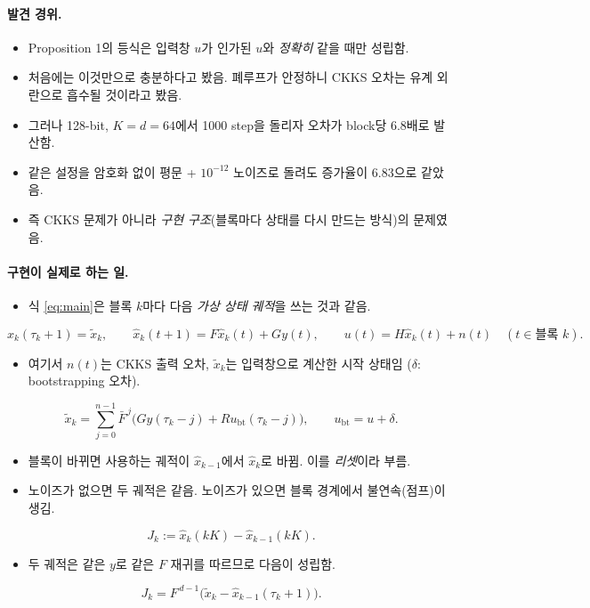 \documentclass[11pt,a4paper]{article}
\newcommand{\Fb}{\bar F}
\begin{document}
\paragraph{발견 경위.}
\begin{itemize}
\item Proposition 1의 등식은 입력창 $u$가 인가된 $u$와 \emph{정확히} 같을 때만 성립함.
\item 처음에는 이것만으로 충분하다고 봤음. 폐루프가 안정하니 CKKS 오차는 유계 외란으로 흡수될 것이라고 봤음.
\item 그러나 128-bit, $K=d=64$에서 1000 step을 돌리자 오차가 block당 6.8배로 발산함.
\item 같은 설정을 암호화 없이 평문 + $10^{-12}$ 노이즈로 돌려도 증가율이 6.83으로 같았음.
\item 즉 CKKS 문제가 아니라 \emph{구현 구조}(블록마다 상태를 다시 만드는 방식)의 문제였음.
\end{itemize}

\paragraph{구현이 실제로 하는 일.}
\begin{itemize}
\item 식 \eqref{eq:main}은 블록 $k$마다 다음 \emph{가상 상태 궤적}을 쓰는 것과 같음.
\end{itemize}
\begin{equation}
\hat x_k(\tau_k+1)=\tilde x_k,\qquad \hat x_k(t+1)=F\hat x_k(t)+Gy(t),\qquad u(t)=H\hat x_k(t)+n(t)\quad(t\in\text{블록 }k).
\end{equation}
\begin{itemize}
\item 여기서 $n(t)$는 CKKS 출력 오차, $\tilde x_k$는 입력창으로 계산한 시작 상태임 ($\delta$: bootstrapping 오차).
\end{itemize}
\begin{equation}
\tilde x_k=\sum_{j=0}^{n-1}\Fb^{\,j}\bigl(Gy(\tau_k-j)+Ru_{\mathrm{bt}}(\tau_k-j)\bigr),\qquad u_{\mathrm{bt}}=u+\delta .
\end{equation}
\begin{itemize}
\item 블록이 바뀌면 사용하는 궤적이 $\hat x_{k-1}$에서 $\hat x_k$로 바뀜. 이를 \emph{리셋}이라 부름.
\item 노이즈가 없으면 두 궤적은 같음. 노이즈가 있으면 블록 경계에서 불연속(점프)이 생김.
\end{itemize}
\begin{equation}
J_k:=\hat x_k(kK)-\hat x_{k-1}(kK).
\end{equation}
\begin{itemize}
\item 두 궤적은 같은 $y$로 같은 $F$ 재귀를 따르므로 다음이 성립함.
\end{itemize}
\begin{equation}
J_k=F^{\,d-1}\bigl(\tilde x_k-\hat x_{k-1}(\tau_k+1)\bigr).
\label{eq:jump-def}
\end{equation}
\end{document}

